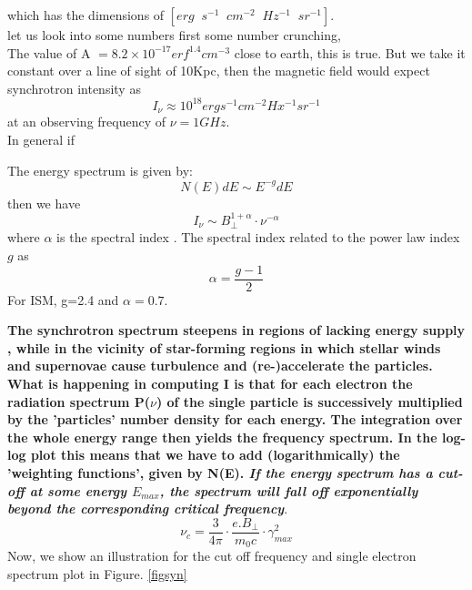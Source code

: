 \documentclass[11pt]{report}
\newcommand{\tit}[1]{\textit{#1}}
\newcommand{\cbox}{tcolorbox}
\newcommand{\rr}[1]{\left[{#1}\right]}
\begin{document}
which has the dimensions of $\rr{erg\;\;s^{-1}\;\;cm^{-2}\;\;Hz^{-1}\;\;sr^{-1}}$.\\
let us look into some numbers first some number crunching, \\
The value of A $=8.2 \times 10^{-17}erf^{1.4}cm^{-3}$ close to earth, this is true. But we take it constant over a line of sight of 10Kpc, then the magnetic field would expect synchrotron intensity as
\begin{equation}
I_\nu \approx 10^{18} erg s^{-1} cm^{-2} Hx^{-1} sr^{-1}
\end{equation} 
at an observing frequency of $\nu =1GHz$.\\
In general if
\begin{\cbox}
The energy spectrum is given by:
\begin{equation}
N(E)dE\sim E^{-g}dE
\end{equation}
then we have
\begin{equation}
I_\nu \sim B_{\perp}^{1+\alpha}\cdot \nu^{-\alpha}
\end{equation}
where $\alpha$ is the spectral index . The spectral index related to the power law index  $g$ as 
\begin{equation}
\alpha=\frac{g-1}{2}
\end{equation}
For ISM, g=2.4 and $\alpha=0.7$.
\end{\cbox}
\textbf{ The synchrotron spectrum steepens in regions of lacking energy supply , while in the vicinity of star-forming regions in which stellar winds and supernovae cause turbulence and (re-)accelerate the particles. What is happening in computing I
is that for each electron the radiation spectrum P($\nu$) of the single particle is successively multiplied by the 'particles' number density for each energy. The integration over the whole energy range then yields the frequency spectrum. In the log-log plot this means that we have to add (logarithmically) the 'weighting functions', given by N(E). \tit{If the energy spectrum has a cut-off at some energy $E_{max}$, the spectrum will fall off exponentially beyond the corresponding critical frequency}}.
\begin{equation}
\nu_c=\frac{3}{4 \pi}\cdot \frac{e. B_{\perp}}{m_0c}\cdot \gamma^2_{max}
\end{equation}
Now, we show an illustration for the cut off frequency and single electron spectrum plot in Figure. \ref{figsyn}
\end{document}
